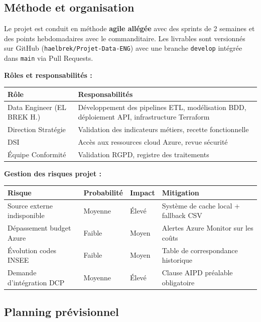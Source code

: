 \documentclass[11pt,a4paper]{article}
\begin{document}
\subsection{Méthode et organisation}

Le projet est conduit en méthode \textbf{agile allégée} avec des sprints de 2 semaines et des
points hebdomadaires avec le commanditaire. Les livrables sont versionnés sur GitHub
(\texttt{haelbrek/Projet-Data-ENG}) avec une branche \texttt{develop} intégrée dans \texttt{main}
via Pull Requests.

\textbf{Rôles et responsabilités :}

\begin{tabular}{L{4cm} L{9.5cm}}
  \toprule
  \textbf{Rôle} & \textbf{Responsabilités} \\
  \midrule
  Data Engineer (EL BREK H.) & Développement des pipelines ETL, modélisation BDD, déploiement API, infrastructure Terraform \\
  Direction Stratégie & Validation des indicateurs métiers, recette fonctionnelle \\
  DSI & Accès aux ressources cloud Azure, revue sécurité \\
  Équipe Conformité & Validation RGPD, registre des traitements \\
  \bottomrule
\end{tabular}

\vspace{0.4em}
\textbf{Gestion des risques projet :}

\begin{tabular}{L{4cm} C{1.8cm} C{1.8cm} L{5.5cm}}
  \toprule
  \textbf{Risque} & \textbf{Probabilité} & \textbf{Impact} & \textbf{Mitigation} \\
  \midrule
  Source externe indisponible & Moyenne & Élevé & Système de cache local + fallback CSV \\
  Dépassement budget Azure & Faible & Moyen & Alertes Azure Monitor sur les coûts \\
  Évolution codes INSEE & Faible & Moyen & Table de correspondance historique \\
  Demande d'intégration DCP & Moyenne & Élevé & Clause AIPD préalable obligatoire \\
  \bottomrule
\end{tabular}

\subsection{Planning prévisionnel}
\end{document}
